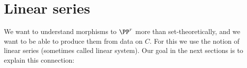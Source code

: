 %
%
%

\section{Linear series}

We want to understand morphisms to $\PP^r$ more than set-theoretically, and we want to be able to produce them from data on $C$. For this we use the notion of linear series (sometimes called linear system). Our goal in the next sections is to explain this connection:

